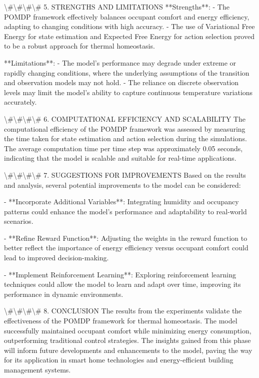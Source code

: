 \documentclass[11pt,a4paper]{article}
\begin{document}
\textbackslash{}#\textbackslash{}#\textbackslash{}#\textbackslash{}# 5. STRENGTHS AND LIMITATIONS
**Strengths**:
- The POMDP framework effectively balances occupant comfort and energy efficiency, adapting to changing conditions with high accuracy.
- The use of Variational Free Energy for state estimation and Expected Free Energy for action selection proved to be a robust approach for thermal homeostasis.

**Limitations**:
- The model's performance may degrade under extreme or rapidly changing conditions, where the underlying assumptions of the transition and observation models may not hold.
- The reliance on discrete observation levels may limit the model's ability to capture continuous temperature variations accurately.

\textbackslash{}#\textbackslash{}#\textbackslash{}#\textbackslash{}# 6. COMPUTATIONAL EFFICIENCY AND SCALABILITY
The computational efficiency of the POMDP framework was assessed by measuring the time taken for state estimation and action selection during the simulations. The average computation time per time step was approximately 0.05 seconds, indicating that the model is scalable and suitable for real-time applications.

\textbackslash{}#\textbackslash{}#\textbackslash{}#\textbackslash{}# 7. SUGGESTIONS FOR IMPROVEMENTS
Based on the results and analysis, several potential improvements to the model can be considered:

- **Incorporate Additional Variables**: Integrating humidity and occupancy patterns could enhance the model's performance and adaptability to real-world scenarios.

- **Refine Reward Function**: Adjusting the weights in the reward function to better reflect the importance of energy efficiency versus occupant comfort could lead to improved decision-making.

- **Implement Reinforcement Learning**: Exploring reinforcement learning techniques could allow the model to learn and adapt over time, improving its performance in dynamic environments.

\textbackslash{}#\textbackslash{}#\textbackslash{}#\textbackslash{}# 8. CONCLUSION
The results from the experiments validate the effectiveness of the POMDP framework for thermal homeostasis. The model successfully maintained occupant comfort while minimizing energy consumption, outperforming traditional control strategies. The insights gained from this phase will inform future developments and enhancements to the model, paving the way for its application in smart home technologies and energy-efficient building management systems.
\end{document}
